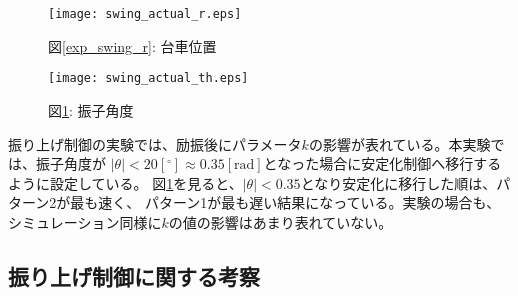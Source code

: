 \begin{figure}[htbp]
    \begin{minipage}{0.5\hsize}
        \begin{center}
            \texttt{[image: swing\_actual\_r.eps]}
            \caption{図\ref{exp_swing_r}: 台車位置}
            \label{exp_swing_r}
        \end{center}
    \end{minipage}
    \begin{minipage}{0.5\hsize}
        \begin{center}
            \texttt{[image: swing\_actual\_th.eps]}
            \caption{図\ref{exp_swing_th}: 振子角度}
            \label{exp_swing_th}
        \end{center}
    \end{minipage}
\end{figure}

振り上げ制御の実験では、励振後にパラメータ$k$の影響が表れている。本実験では、振子角度が
$|\theta| < 20[^\circ] \approx 0.35[\mbox{rad}]$となった場合に安定化制御へ移行するように設定している。
図\ref{exp_swing_th}を見ると、$|\theta| < 0.35$となり安定化に移行した順は、パターン2が最も速く、
パターン1が最も遅い結果になっている。実験の場合も、シミュレーション同様に$k$の値の影響はあまり表れていない。


\subsection{振り上げ制御に関する考察}


